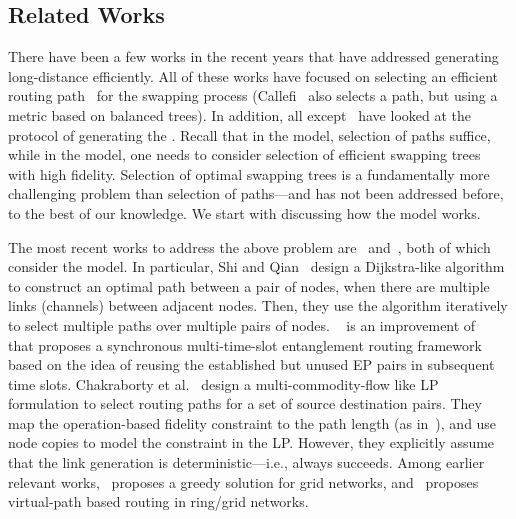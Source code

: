 \subsection{Related Works}
\label{sec:swapping_related}

There have been a few works in the recent years that have addressed generating long-distance \epss
efficiently. All of these works have focused on selecting an efficient routing path~\cite{sigcomm20,yiming2023,yuhang2023} for the swapping
process (Callefi~\cite{caleffi} also selects a path, but using a metric based
on balanced trees).
In addition, all except~\cite{caleffi} have looked at the \os protocol of generating the
\epss. Recall that in the \os model, selection of paths suffice, while in the \wt model, one needs
to consider selection of efficient swapping trees with high fidelity.
Selection of optimal swapping trees is a fundamentally more challenging problem 
than selection of paths---and has not 
been addressed before, to the best of our knowledge.  We start with discussing how the \os model
works.

The most recent works to address the above problem are~\cite{sigcomm20} and~\cite{delft-lp}, 
both of which consider the \os model. 
In particular, Shi and Qian~\cite{sigcomm20} design a Dijkstra-like algorithm to construct an optimal path
between a pair of nodes, when there are multiple links (channels) between adjacent nodes. Then,
they use the algorithm iteratively to select multiple paths over multiple pairs of nodes.
~\cite{yuhang2023} is an improvement of~\cite{sigcomm20} that proposes a synchronous multi-time-slot entanglement routing framework
based on the idea of reusing the established but unused EP pairs in subsequent time slots.
Chakraborty et al.~\cite{delft-lp} design a multi-commodity-flow
like LP formulation to select routing paths for a set of source destination pairs. They map
the operation-based fidelity constraint to the path length (as in~\cite{BreigelEtAl1998}), and use
node copies to model the constraint in the LP. However, they explicitly assume that the link
\eps generation is deterministic---i.e., always succeeds. 
Among earlier relevant works,~\cite{guha} proposes a greedy solution
for grid networks, and~\cite{greedy2019distributed} proposes 
virtual-path based routing in ring/grid networks.

